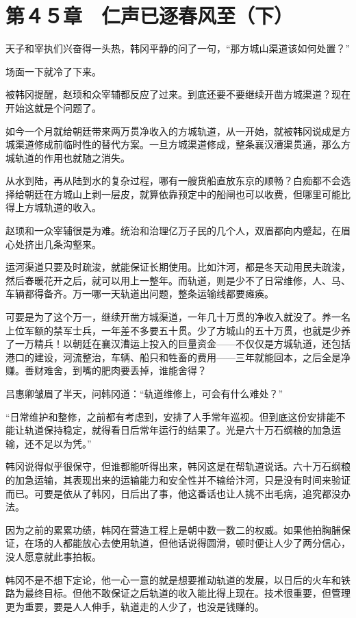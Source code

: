 \section{第４５章　仁声已逐春风至（下）}

天子和宰执们兴奋得一头热，韩冈平静的问了一句，“那方城山渠道该如何处置？”

场面一下就冷了下来。

被韩冈提醒，赵顼和众宰辅都反应了过来。到底还要不要继续开凿方城渠道？现在开始这就是个问题了。

如今一个月就给朝廷带来两万贯净收入的方城轨道，从一开始，就被韩冈说成是方城渠道修成前临时性的替代方案。一旦方城渠道修成，整条襄汉漕渠贯通，那么方城轨道的作用也就随之消失。

从水到陆，再从陆到水的复杂过程，哪有一艘货船直放东京的顺畅？白痴都不会选择给朝廷在方城山上剥一层皮，就算依靠预定中的船闸也可以收费，但哪里可能比得上方城轨道的收入。

赵顼和一众宰辅很是为难。统治和治理亿万子民的几个人，双眉都向内蹙起，在眉心处挤出几条沟壑来。

运河渠道只要及时疏浚，就能保证长期使用。比如汴河，都是冬天动用民夫疏浚，然后春暖花开之后，就可以用上一整年。而轨道，则是少不了日常维修，人、马、车辆都得备齐。万一哪一天轨道出问题，整条运输线都要瘫痪。

可要是为了这个万一，继续开凿方城渠道，一年几十万贯的净收入就没了。养一名上位军额的禁军士兵，一年差不多要五十贯。少了方城山的五十万贯，也就是少养了一万精兵！以朝廷在襄汉漕运上投入的巨量资金——不仅仅是方城轨道，还包括港口的建设，河流整治，车辆、船只和牲畜的费用——三年就能回本，之后全是净赚。善财难舍，到嘴的肥肉要丢掉，谁能舍得？

吕惠卿皱眉了半天，问韩冈道：“轨道维修上，可会有什么难处？”

“日常维护和整修，之前都有考虑到，安排了人手常年巡视。但到底这份安排能不能让轨道保持稳定，就得看日后常年运行的结果了。光是六十万石纲粮的加急运输，还不足以为凭。”

韩冈说得似乎很保守，但谁都能听得出来，韩冈这是在帮轨道说话。六十万石纲粮的加急运输，其表现出来的运输能力和安全性并不输给汴河，只是没有时间来验证而已。可要是依从了韩冈，日后出了事，他这番话也让人挑不出毛病，追究都没办法。

因为之前的累累功绩，韩冈在营造工程上是朝中数一数二的权威。如果他拍胸脯保证，在场的人都能放心去使用轨道，但他话说得圆滑，顿时便让人少了两分信心，没人愿意就此事拍板。

韩冈不是不想下定论，他一心一意的就是想要推动轨道的发展，以日后的火车和铁路为最终目标。但他不敢保证之后轨道的收入能比得上现在。技术很重要，但管理更为重要，要是人人伸手，轨道走的人少了，也没是钱赚的。

